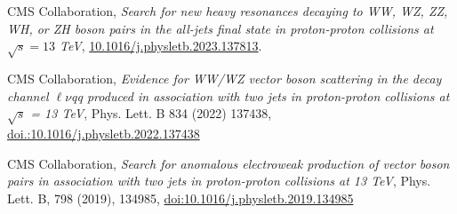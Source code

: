 {\begin{flushleft}

\end{flushleft}

\begin{thebibliography}{9}
\bibitem{[1]}
CMS Collaboration, {\em Search for new heavy resonances decaying to WW, WZ, ZZ, WH, or ZH boson pairs in the all-jets final state in proton-proton collisions at $\sqrt{s}=13$ TeV},
\href{http://dx.doi.org/10.1016/j.physletb.2023.137813}{10.1016/j.physletb.2023.137813}.

\bibitem{[2]}
CMS Collaboration, {\em Evidence for WW/WZ vector boson scattering in the decay channel $\ell\nu$qq produced in association with two jets in proton-proton collisions at $\sqrt{s}$ = 13 TeV}, Phys. Lett. B 834 (2022) 137438, \href{https://doi.org/10.1016/j.physletb.2022.137438}{doi.:10.1016/j.physletb.2022.137438}

\bibitem{[3]}
CMS Collaboration, {\em Search for anomalous electroweak production of vector boson pairs in association with two jets in proton-proton collisions at 13 TeV}, Phys. Lett. B, 798 (2019), 134985, \href{https://doi.org/10.1016/j.physletb.2019.134985}{doi:10.1016/j.physletb.2019.134985}


\end{thebibliography}}
